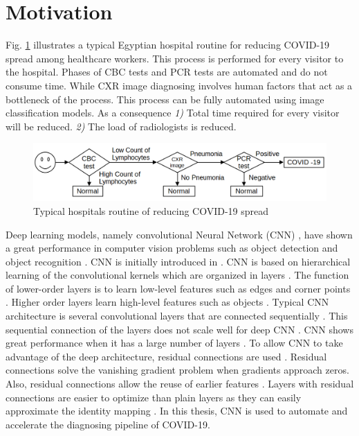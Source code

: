 \section{Motivation}
Fig. \ref{hospitalRoutine} illustrates a typical Egyptian hospital routine for reducing COVID-19 spread among healthcare workers. This process is performed for every visitor to the hospital. Phases of CBC tests and PCR tests are automated and do not consume time. While CXR image diagnosing involves human factors that act as a bottleneck of the process. This process can be fully automated using image classification models. As a consequence \textit{1)} Total time required for every visitor will be reduced. \textit{2)} The load of radiologists is reduced. 

\begin{figure}%
    \centering
        \includegraphics[width=\textwidth]{Figures/HosPitalCovidRoutine.png}
        \caption{Typical hospitals routine of reducing COVID-19 spread}
        \label{hospitalRoutine}
\end{figure}

Deep learning \cite{lecun2015deep} models, namely convolutional Neural Network (CNN) \cite{lecun1989handwritten}, have shown a great performance in computer vision problems such as object detection \cite{erhan2014scalable}\cite{girshick2014rich}\cite{sermanet2013overfeat}\cite{redmon2016you} and object recognition \cite{simonyan2014very}\cite{he2016deep}. CNN is initially introduced in \cite{lecun1989handwritten}. CNN  is based on hierarchical learning of the convolutional kernels which are organized in layers \cite{krizhevsky2012imagenet}. The function of lower-order layers is to learn low-level features such as edges and corner points \cite{zeiler2014visualizing}. Higher order layers learn high-level features such as objects \cite{zeiler2014visualizing}. Typical CNN architecture is several convolutional layers that are connected sequentially \cite{simonyan2014very}. This sequential connection of the layers does not scale well for deep CNN \cite{he2016deep}. CNN shows great performance when it has a large number of layers \cite{he2016deep}. To allow CNN to take advantage of the deep architecture, residual connections are used \cite{he2016deep}. Residual connections solve the vanishing gradient problem when gradients approach zeros. Also, residual connections allow the reuse of earlier features \cite{huang2017densely}. Layers with residual connections are easier to optimize than plain layers as they can easily approximate the identity mapping \cite{he2016deep}. In this thesis, CNN is used to automate and accelerate the diagnosing pipeline of COVID-19. 

